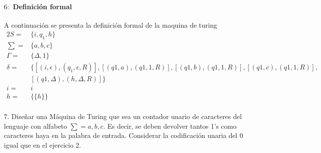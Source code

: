 \documentclass[10pt,a4paper]{book}
\begin{document}
{\begin{figure*}[ht!]
\end{figure*}
\paragraph{$6:$ Definición formal}A continuación se presenta la definición formal de la maquina de turing\\[0.2cm]
\begin{alignat*}{2}
	S=& \{i, q_1,h\}\\
	\textstyle \sum=& \{a,b,c\}\\
	\Gamma=&\{\Delta,1\}\\
	\delta=&\{[(i,\epsilon), (q_1,\epsilon,R)], [(q1,a), (q1,1,R)], [(q1,b), (q1,1,R)], [(q1,c), (q1,1,R)],\\& [(q1,\Delta), (h,\Delta,R)]\}\\
	i=&i\\
	h=&\{\{h\}\}
\end{alignat*}
\newpage
\paragraph{}7. Diseñar una Máquina de Turing que sea un contador unario de caracteres del lenguaje con alfabeto $\sum = {a,b,c}$. Es decir, se deben devolver tantos 1’s como caracteres haya en la palabra de entrada. Considerar la codificación unaria del 0 igual que en el ejercicio 2.\\[1cm]
\begin{figure*}[ht!]
	\centering
\end{figure*}

}
\end{document}
